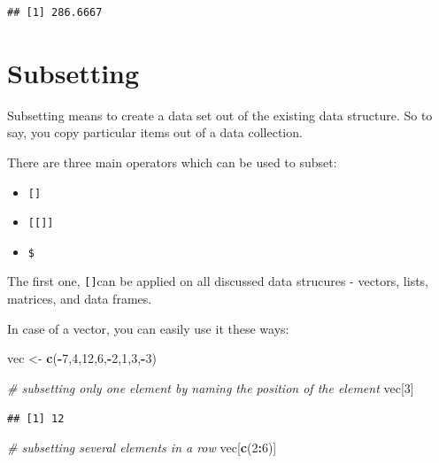 \documentclass[]{report}
\newenvironment{Shaded}{\begin{snugshade}}{\end{snugshade}}
\newcommand{\KeywordTok}[1]{\textcolor[rgb]{0.13,0.29,0.53}{\textbf{#1}}}
\newcommand{\DecValTok}[1]{\textcolor[rgb]{0.00,0.00,0.81}{#1}}
\newcommand{\StringTok}[1]{\textcolor[rgb]{0.31,0.60,0.02}{#1}}
\newcommand{\CommentTok}[1]{\textcolor[rgb]{0.56,0.35,0.01}{\textit{#1}}}
\newcommand{\OperatorTok}[1]{\textcolor[rgb]{0.81,0.36,0.00}{\textbf{#1}}}
\newcommand{\NormalTok}[1]{#1}
\providecommand{\tightlist}{%
  \setlength{\itemsep}{0pt}\setlength{\parskip}{0pt}}
\begin{document}
\begin{verbatim}
## [1] 286.6667
\end{verbatim}

\section{Subsetting}\label{subsetting}

Subsetting means to create a data set out of the existing data
structure. So to say, you copy particular items out of a data
collection.

There are three main operators which can be used to subset:

\begin{itemize}
\tightlist
\item
  \texttt{{[}{]}}
\item
  \texttt{{[}{[}{]}{]}}
\item
  \texttt{\$}
\end{itemize}

The first one, \texttt{{[}{]}}can be applied on all discussed data
strucures - vectors, lists, matrices, and data frames.

In case of a vector, you can easily use it these ways:

\begin{Shaded}
\begin{Highlighting}[]
\NormalTok{vec <-}\StringTok{ }\KeywordTok{c}\NormalTok{(}\OperatorTok{-}\DecValTok{7}\NormalTok{,}\DecValTok{4}\NormalTok{,}\DecValTok{12}\NormalTok{,}\DecValTok{6}\NormalTok{,}\OperatorTok{-}\DecValTok{2}\NormalTok{,}\DecValTok{1}\NormalTok{,}\DecValTok{3}\NormalTok{,}\OperatorTok{-}\DecValTok{3}\NormalTok{)}

\CommentTok{# subsetting only one element by naming the position of the element}
\NormalTok{vec[}\DecValTok{3}\NormalTok{]}
\end{Highlighting}
\end{Shaded}

\begin{verbatim}
## [1] 12
\end{verbatim}

\begin{Shaded}
\begin{Highlighting}[]
\CommentTok{# subsetting several elements in a row}
\NormalTok{vec[}\KeywordTok{c}\NormalTok{(}\DecValTok{2}\OperatorTok{:}\DecValTok{6}\NormalTok{)]}
\end{Highlighting}
\end{Shaded}
\end{document}
